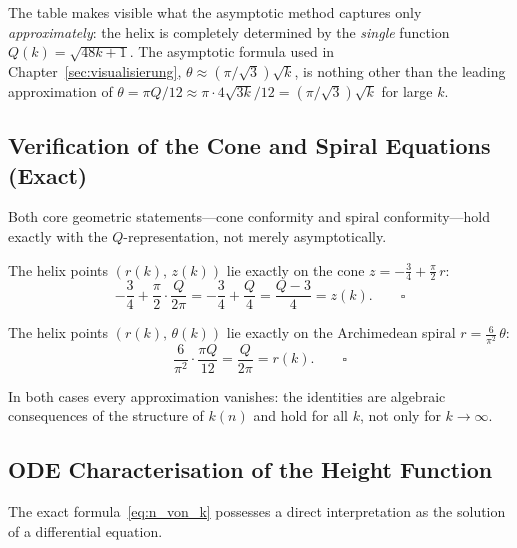 \noindent
The table makes visible what the asymptotic method captures only
\emph{approximately}: the helix is completely determined by the
\emph{single} function $Q(k) = \sqrt{48k+1}$. The
asymptotic formula used in Chapter~\ref{sec:visualisierung},
$\theta \approx (\pi/\sqrt{3})\sqrt{k}$, is nothing other than
the leading approximation of $\theta = \pi Q / 12 \approx \pi \cdot 4\sqrt{3k}/12
= (\pi/\sqrt{3})\sqrt{k}$ for large $k$.

\subsection{Verification of the Cone and Spiral Equations (Exact)}
\label{subsec:verifikation}

Both core geometric statements---cone conformity and spiral conformity---hold
exactly with the $Q$-representation, not merely asymptotically.

\begin{satz}\label{satz:kegel}
The helix points $(r(k),\, z(k))$ lie exactly on the cone
$z = -\tfrac{3}{4} + \tfrac{\pi}{2}\,r$:
\[
  -\frac{3}{4} + \frac{\pi}{2}\cdot\frac{Q}{2\pi}
  = -\frac{3}{4} + \frac{Q}{4}
  = \frac{Q-3}{4}
  = z(k). \qquad \square
\]
\end{satz}

\begin{satz}\label{satz:spirale}
The helix points $(r(k),\, \theta(k))$ lie exactly on the
Archimedean spiral $r = \tfrac{6}{\pi^2}\,\theta$:
\[
  \frac{6}{\pi^2}\cdot\frac{\pi Q}{12}
  = \frac{Q}{2\pi}
  = r(k). \qquad \square
\]
\end{satz}

\noindent
In both cases every approximation vanishes: the identities are
algebraic consequences of the structure of $k(n)$ and hold for
all $k$, not only for $k \to \infty$.

\subsection{ODE Characterisation of the Height Function}
\label{subsec:ode}

The exact formula~\eqref{eq:n_von_k} possesses a direct
interpretation as the solution of a differential equation.

